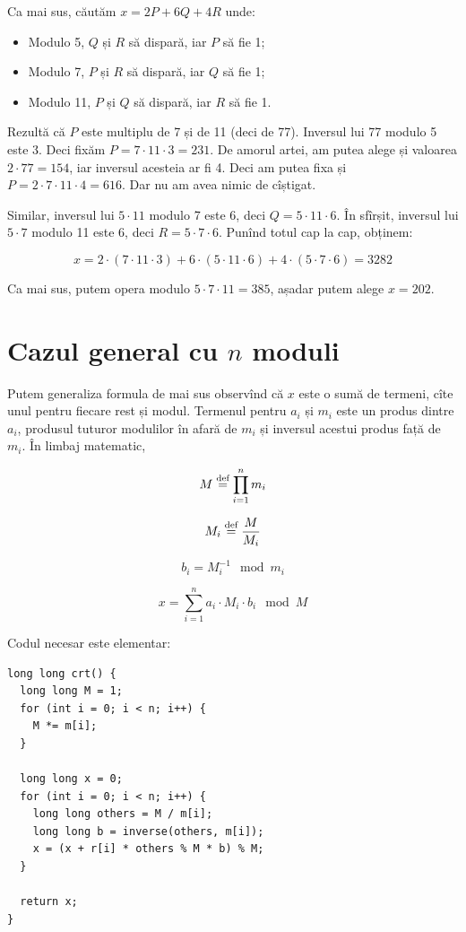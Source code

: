 \documentclass[../main.tex]{subfiles}
\begin{document}
Ca mai sus, căutăm $x = 2P + 6Q + 4R$ unde:

\begin{itemize}
  \item Modulo 5, $Q$ și $R$ să dispară, iar $P$ să fie 1;
  \item Modulo 7, $P$ și $R$ să dispară, iar $Q$ să fie 1;
  \item Modulo 11, $P$ și $Q$ să dispară, iar $R$ să fie 1.
\end{itemize}

Rezultă că $P$ este multiplu de 7 și de 11 (deci de 77). Inversul lui 77 modulo 5 este 3. Deci fixăm $P = 7 \cdot 11 \cdot 3 = 231$. De amorul artei, am putea alege și valoarea $2 \cdot 77 = 154$, iar inversul acesteia ar fi 4. Deci am putea fixa și $P = 2 \cdot 7 \cdot 11 \cdot 4 = 616$. Dar nu am avea nimic de cîștigat.

Similar, inversul lui $5 \cdot 11$ modulo 7 este 6, deci $Q = 5 \cdot 11 \cdot 6$. În sfîrșit, inversul lui $5 \cdot 7$ modulo 11 este 6, deci $R = 5 \cdot 7 \cdot 6$. Punînd totul cap la cap, obținem:

$$
x = 2 \cdot (7 \cdot 11 \cdot 3) + 6 \cdot (5 \cdot 11 \cdot 6) + 4 \cdot (5 \cdot 7 \cdot 6) = 3282
$$

Ca mai sus, putem opera modulo $5 \cdot 7 \cdot 11 = 385$, așadar putem alege $x = 202$.

\section{Cazul general cu \texorpdfstring{$n$}{n} moduli}

Putem generaliza formula de mai sus observînd că $x$ este o sumă de termeni, cîte unul pentru fiecare rest și modul. Termenul pentru $a_i$ și $m_i$ este un produs dintre $a_i$, produsul tuturor modulilor în afară de $m_i$ și inversul acestui produs față de $m_i$. În limbaj matematic,

$$M \stackrel{\text{def}}{=} \prod_{i=1}^{n} m_i$$

$$M_i \stackrel{\text{def}}{=} \frac{M}{M_i}$$

$$b_i = M_i^{-1} \mod m_i$$

$$x = \sum_{i=1}^{n} a_i \cdot M_i \cdot b_i \mod M$$

Codul necesar este elementar:

\begin{verbatim}
long long crt() {
  long long M = 1;
  for (int i = 0; i < n; i++) {
    M *= m[i];
  }

  long long x = 0;
  for (int i = 0; i < n; i++) {
    long long others = M / m[i];
    long long b = inverse(others, m[i]);
    x = (x + r[i] * others % M * b) % M;
  }

  return x;
}
\end{verbatim}
\end{document}
